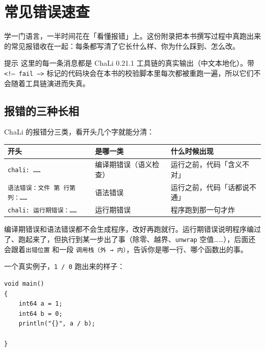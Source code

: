 \chapter{常见错误速查}
\label{ch:appA}

学一门语言，一半时间花在「看懂报错」上。这份附录把本书撰写过程中真跑出来的常见报错收在一起：每条都写清了它长什么样、你为什么踩到、怎么改。

\begin{tip}{提示}
这里的每一条消息都是 ChaLi 0.21.1 工具链的真实输出（中文本地化）。带 \texttt{<\allowbreak{}!-- fail -->\allowbreak{}} 标记的代码块会在本书的校验脚本里每次都被重跑一遍，所以它们不会随着工具链演进而失真。
\end{tip}

\section{报错的三种长相}

ChaLi 的报错分三类，看开头几个字就能分清：

{\small\setlength{\tabcolsep}{4pt}
\begin{longtable}{>{\raggedright\arraybackslash}p{}>{\raggedright\arraybackslash}p{}>{\raggedright\arraybackslash}p{}}
\toprule
开头 & 是哪一类 & 什么时候出现 \\
\midrule
\endhead
\texttt{chali:\allowbreak{} ……} & 编译期错误（语义检查） & 运行之前，代码「含义不对」 \\
\texttt{语法错误：文件 第 行第 列：……} & 语法错误 & 运行之前，代码「话都说不通」 \\
\texttt{chali:\allowbreak{} 运行期错误：……} & 运行期错误 & 程序跑到那一句才炸 \\
\bottomrule
\end{longtable}
}

编译期错误和语法错误都不会生成程序，改好再跑就行。运行期错误说明程序编过了、跑起来了，但执行到某一步出了事（除零、越界、\texttt{unwrap} 空值……），后面还会跟着\texttt{出错位置} 和一段 \texttt{调用栈（外 → 内）}，告诉你是哪一行、哪个函数出的事。

一个真实例子，\texttt{1 /\allowbreak{} 0} 跑出来的样子：

\par
\medskip
\begin{lstlisting}[style=chali]
void main()
{
    int64 a = 1;
    int64 b = 0;
    println("{}", a / b);

}
\end{lstlisting}
\par
\medskip

